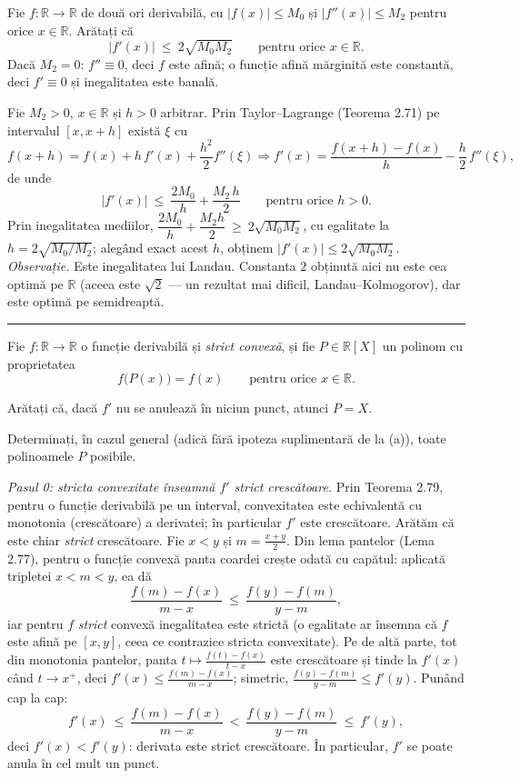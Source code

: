 Fie $f:\mathbb{R}\to\mathbb{R}$ de două ori derivabilă, cu $|f(x)|\le M_0$ și $|f''(x)|\le M_2$ pentru orice $x\in\mathbb{R}$. Arătați că
\[ |f'(x)|\ \le\ 2\sqrt{M_0M_2}\qquad\text{pentru orice }x\in\mathbb{R}. \]
\sol Dacă $M_2=0$: $f''\equiv0$, deci $f$ este afină; o funcție afină mărginită este constantă, deci $f'\equiv0$ și inegalitatea este banală.

Fie $M_2>0$, $x\in\mathbb{R}$ și $h>0$ arbitrar. Prin Taylor--Lagrange (Teorema 2.71) pe intervalul $[x,x+h]$ există $\xi$ cu
\[ f(x+h)=f(x)+h\,f'(x)+\frac{h^2}{2}f''(\xi) \Longrightarrow f'(x)=\frac{f(x+h)-f(x)}{h}-\frac h2\,f''(\xi), \]
de unde
\[ |f'(x)|\ \le\ \frac{2M_0}{h}+\frac{M_2\,h}{2}\qquad\text{pentru orice }h>0 . \]
Prin inegalitatea mediilor, $\dfrac{2M_0}h+\dfrac{M_2h}2\ \ge\ 2\sqrt{M_0M_2}$, cu egalitate la $h=2\sqrt{M_0/M_2}$; alegând exact acest $h$, obținem $|f'(x)|\le2\sqrt{M_0M_2}$.\\[2pt]
\emph{Observație.} Este inegalitatea lui Landau. Constanta $2$ obținută aici nu este cea optimă pe $\mathbb{R}$ (aceea este $\sqrt2$ --- un rezultat mai dificil, Landau--Kolmogorov), dar este optimă pe semidreaptă.
\vspace{1mm}\hrule

Fie $f:\mathbb{R}\to\mathbb{R}$ o funcție derivabilă și \emph{strict convexă}, și fie $P\in\mathbb{R}[X]$ un polinom cu proprietatea
\[ f\bigl(P(x)\bigr)=f(x)\qquad\text{pentru orice }x\in\mathbb{R}. \]
\begin{parti}
  \item Arătați că, dacă $f'$ nu se anulează în niciun punct, atunci $P=X$.
  \item Determinați, în cazul general (adică fără ipoteza suplimentară de la (a)), toate polinoamele $P$ posibile.
\end{parti}
\sol \emph{Pasul 0: stricta convexitate înseamnă $f'$ strict crescătoare.}
Prin Teorema 2.79, pentru o funcție derivabilă pe un interval, convexitatea este echivalentă cu monotonia (crescătoare) a derivatei; în particular $f'$ este crescătoare. Arătăm că este chiar \emph{strict} crescătoare. Fie $x<y$ și $m=\frac{x+y}{2}$. Din lema pantelor (Lema 2.77), pentru o funcție convexă panta coardei crește odată cu capătul: aplicată tripletei $x<m<y$, ea dă
\[ \frac{f(m)-f(x)}{m-x}\ \le\ \frac{f(y)-f(m)}{y-m}, \]
iar pentru $f$ \emph{strict} convexă inegalitatea este strictă (o egalitate ar însemna că $f$ este afină pe $[x,y]$, ceea ce contrazice stricta convexitate). Pe de altă parte, tot din monotonia pantelor, panta $t\mapsto\frac{f(t)-f(x)}{t-x}$ este crescătoare și tinde la $f'(x)$ când $t\to x^{+}$, deci $f'(x)\le\frac{f(m)-f(x)}{m-x}$; simetric, $\frac{f(y)-f(m)}{y-m}\le f'(y)$. Punând cap la cap:
\[ f'(x)\ \le\ \frac{f(m)-f(x)}{m-x}\ <\ \frac{f(y)-f(m)}{y-m}\ \le\ f'(y) , \]
deci $f'(x)<f'(y)$: derivata este strict crescătoare. În particular, $f'$ se poate anula în cel mult un punct.

